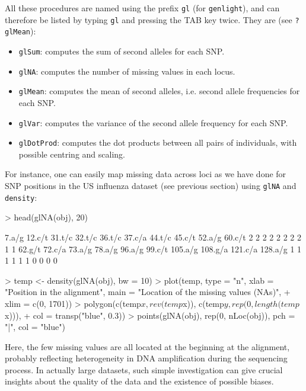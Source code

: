 \documentclass{article}
\begin{document}
All these procedures are named using the prefix \texttt{gl} (for \texttt{genlight}), and can therefore be listed by
typing \texttt{gl} and pressing the TAB key twice.
They are (see \texttt{?glMean}):
\begin{itemize}
\item \texttt{glSum}: computes the sum of second alleles for each SNP.
\item \texttt{glNA}: computes the number of missing values in each locus.
\item \texttt{glMean}: computes the mean of second alleles, i.e. second allele frequencies for
  each SNP.
\item \texttt{glVar}: computes the variance of the second allele frequency for each SNP.
\item \texttt{glDotProd}: computes the dot products between all pairs of individuals, with
  possible centring and scaling.
\end{itemize}
For instance, one can easily map missing data across loci as we have done for SNP positions in the
US influenza dataset (see previous section) using \texttt{glNA} and \texttt{density}:
\begin{Schunk}
\begin{Sinput}
> head(glNA(obj), 20)
\end{Sinput}
\begin{Soutput}
  7.a/g  12.c/t  31.t/c  32.t/c  36.t/c  37.c/a  44.t/c  45.c/t  52.a/g  60.c/t 
      2       2       2       2       2       2       2       2       1       1 
 62.g/t  72.c/a  73.a/g  78.a/g  96.a/g  99.c/t 105.a/g 108.g/a 121.c/a 128.a/g 
      1       1       1       1       1       1       0       0       0       0 
\end{Soutput}
\begin{Sinput}
> temp <- density(glNA(obj), bw = 10)
> plot(temp, type = "n", xlab = "Position in the alignment", main = "Location of the missing values (NAs)", 
+     xlim = c(0, 1701))
> polygon(c(temp$x, rev(temp$x)), c(temp$y, rep(0, length(temp$x))), 
+     col = transp("blue", 0.3))
> points(glNA(obj), rep(0, nLoc(obj)), pch = "|", col = "blue")
\end{Sinput}
\end{Schunk}

\noindent Here, the few missing values are all located at the beginning at the alignment, probably
reflecting heterogeneity in DNA amplification during the sequencing process.
In actually large datasets, such simple investigation can give crucial insights about the quality of
the data and the existence of possible biases.
\end{document}
